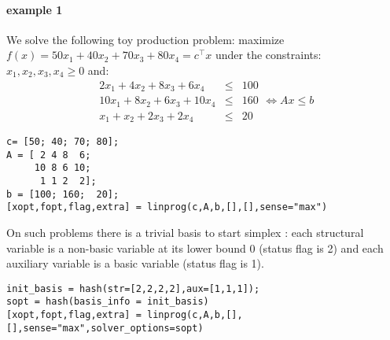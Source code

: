\begin{examples}
\paragraph{example 1} We solve the following toy production problem: maximize
$f(x) = 50 x_1 + 40 x_2 + 70 x_3 + 80 x_4 = c^{\top} x$ under the constraints:
$x_1, x_2, x_3, x_4 \ge  0$ and:
$$
\begin{array}{rcl}
   2 x_1 + 4 x_2 +  8 x_3 +  6 x_4 & \le & 100\\
   10 x_1 + 8 x_2 + 6 x_3 + 10 x_4 & \le & 160\\
      x_1 +  x_2  + 2 x_3 +  2 x_4 & \le & 20
\end{array} \iff  A x \le b
$$
\begin{Verbatim}
c= [50; 40; 70; 80];
A = [ 2 4 8  6;
     10 8 6 10;
      1 1 2  2];
b = [100; 160;  20];
[xopt,fopt,flag,extra] = linprog(c,A,b,[],[],sense="max")
\end{Verbatim}
On such problems there is a trivial basis to start simplex : each structural variable
is a non-basic variable at its lower bound 0 (status flag is 2) and each auxiliary variable 
is a basic variable (status flag is 1). 
\begin{Verbatim}
init_basis = hash(str=[2,2,2,2],aux=[1,1,1]);
sopt = hash(basis_info = init_basis)
[xopt,fopt,flag,extra] = linprog(c,A,b,[],[],sense="max",solver_options=sopt)
\end{Verbatim}


\end{examples}
